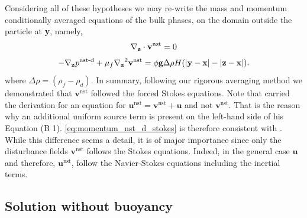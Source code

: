 Considering all of these hypotheses we may re-write the mass and momentum conditionally averaged equations of the bulk phases, on the domain outside the particle at \textbf{y}, namely,
\begin{equation}
    \pddz \cdot \textbf{v}^\text{nst}
    = 0
    \label{eq:mass_nst_d_stokes}
\end{equation}
\begin{equation}
    - \pddz p^\text{nst-d} 
    + \mu_f \pddz^2 \textbf{v}^\text{nst}
    = 
    \phi
    \textbf{g}
    \Delta\rho H(|\textbf{y} - \textbf{x}| - |\textbf{z} - \textbf{x}|). 
    \label{eq:momentum_nst_d_stokes}
\end{equation}
where $\Delta \rho = (\rho_f - \rho_d)$. 
In summary, following our rigorous averaging method we demonstrated that $\textbf{v}^\text{nst}$ followed the forced Stokes equations. 
Note that \citet{zhang2021ensemble} carried the derivation for an equation for $\textbf{u}^\text{nst} = \textbf{v}^\text{nst} + \textbf{u}$ and not $\textbf{v}^\text{nst}$. 
That is the reason why an additional uniform source term is present on the left-hand side of his Equation (B 1). 
\ref{eq:momentum_nst_d_stokes} is therefore consistent with \citet{zhang2021ensemble}. 
While this difference seems a detail, it is of major importance since only the disturbance fields $\textbf{v}^\text{nst}$ follows the Stokes equations.
Indeed, in the general case $\textbf{u}$ and therefore, $\textbf{u}^\text{nst}$, follow the Navier-Stokes equations including the inertial terms. 






\subsection{Solution without buoyancy } 

